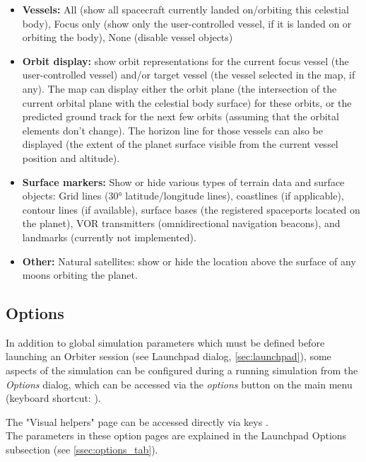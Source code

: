 \documentclass[Orbiter User Manual.tex]{subfiles}
\begin{document}
\begin{itemize}
\item \textbf{Vessels:} All (show all spacecraft currently landed on/orbiting this celestial body), Focus only (show only the user-controlled vessel, if it is landed on or orbiting the body), None (disable vessel objects)
\item \textbf{Orbit display:} show orbit representations for the current focus vessel (the user-controlled vessel) and/or target vessel (the vessel selected in the map, if any). The map can display either the orbit plane (the intersection of the current orbital plane with the celestial body surface) for these orbits, or the predicted ground track for the next few orbits (assuming that the orbital elements don't change). The horizon line for those vessels can also be displayed (the extent of the planet surface visible from the current vessel position and altitude).
\item \textbf{Surface markers:} Show or hide various types of terrain data and surface objects: Grid lines (30° latitude/longitude lines), coastlines (if applicable), contour lines (if available), surface bases (the registered spaceports located on the planet), VOR transmitters (omnidirectional navigation beacons), and landmarks (currently not implemented).
\item \textbf{Other:} Natural satellites: show or hide the location above the surface of any moons orbiting the planet.
\end{itemize}


\subsection{Options}
\label{ssec:menu_options}
In addition to global simulation parameters which must be defined before launching an Orbiter session (see Launchpad dialog, \ref{sec:launchpad}), some aspects of the simulation can be configured during a running simulation from the \textit{Options} dialog, which can be accessed via the \textit{options} button on the main menu (keyboard shortcut: ).

\begin{figure}[H]
	\centering
\end{figure}

\noindent
The "Visual helpers" page can be accessed directly via keys \Ctrl{}.\\
The parameters in these option pages are explained in the Launchpad Options subsection (see \ref{ssec:options_tab}).
\end{document}
